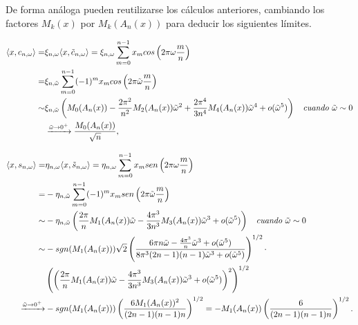 De forma análoga pueden reutilizarse los cálculos anteriores,
cambiando los factores $M_{k}(x)$ por $M_{k}(A_{n}(x))$
para deducir los siguientes límites.


\begin{align*}
\langle x,
c_{n, \omega}
\rangle = & 
\xi_{n, \omega} \langle x,
\tilde{c}_{n, \omega}
\rangle =  
\xi_{n, \omega} \sum\limits_{m=0}^{n-1}x_{m} cos \left(
2 \pi \omega \frac{m}{n}
\right)
\\
= &  
\xi_{n, \tilde{\omega}} \sum\limits_{m=0}^{n-1}(-1)^{m}x_{m} cos \left(
2 \pi \tilde{\omega} \frac{m}{n}
\right)\\
\sim &
\xi_{n, \tilde{\omega}} 
\left(
M_{0}(A_{n}(x)) - \frac{2 \pi^{2}}{n^{2}}M_{2}(A_{n}(x)) \tilde{\omega}^{2} 
+ \frac{2 \pi^{4}}{3n^{4}} M_{4}(A_{n}(x)) \tilde{\omega}^{4} + o(\tilde{\omega}^{5})
\right) 
\hspace{0.2cm} \textit{ cuando } \tilde{\omega} \sim 0
\\
& 
\xrightarrow{\tilde{\omega} \rightarrow 0^{+}}
\frac{M_{0}(A_{n}(x))}{\sqrt{n}},
\end{align*}

\begin{align*}
\langle x,
s_{n, \omega}
\rangle = &
\eta_{n, \omega}
\langle
x, \tilde{s}_{n, \omega}
\rangle
= \eta_{n, \omega}
\sum\limits_{m=0}^{n-1}
x_{m}sen\left(
2 \pi \omega\frac{m}{n}
\right)
 \\
= &
- \eta_{n, \tilde{\omega}}
\sum\limits_{m=0}^{n-1}
(-1)^{m}
x_{m}sen\left(
2 \pi \tilde{\omega} \frac{m}{n}
\right)
 \\
\sim &
-\eta_{n, \tilde{\omega}}
\left(
\frac{2\pi}{n} M_{1}(A_{n}(x)) \tilde{\omega}
-\frac{4\pi^{3}}{3n^{3}} M_{3}(A_{n}(x)) \tilde{\omega}^{3}
+ o(\tilde{\omega}^{5})
\right)
\hspace{0.2cm} \textit{ cuando } \tilde{\omega} \sim 0 \\
\sim &
- sgn(M_{1}(A_{n}(x)))
\sqrt{2} 
\left(
\frac{
6 \pi n \tilde{\omega} -
\frac{4 \pi^{3}}{n} \tilde{\omega}^{3} + o(\tilde{\omega}^{5})
}{8 \pi^{3} (2n-1)(n-1)\tilde{\omega}^{3} + o(\tilde{\omega}^{5})
}
\right)^{1/2}
\cdot \\ 
& 
\left(
\left(
\frac{2 \pi}{n} M_{1}(A_{n}(x)) \tilde{\omega} - \frac{4 \pi^{3}}{3n^{3}}
M_{3}(A_{n}(x)) \tilde{\omega}^{3} 
+ o(\tilde{\omega}^{5})
\right)^{2}
\right)^{1/2}\\
\xrightarrow{\tilde{\omega} \rightarrow 0^{+}} & - 
sgn(M_{1}(A_{n}(x)))
\left(
\frac{6 M_{1}(A_{n}(x))^{2}}{(2n-1)(n-1)n}
\right)^{1/2}
= -M_{1}(A_{n}(x))
\left(
\frac{6}{(2n-1)(n-1)n}
\right)^{1/2}.
\end{align*}

